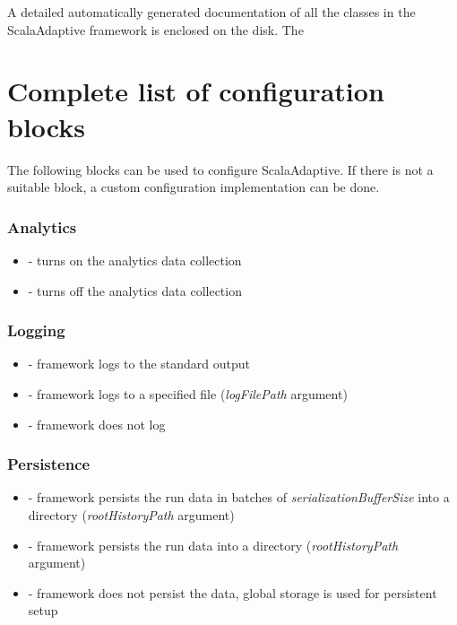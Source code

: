 \documentclass[12pt,a4paper]{report}
\begin{document}
A detailed automatically generated documentation of all the classes in the ScalaAdaptive framework is enclosed on the disk. The 

\section{Complete list of configuration blocks}
\label{attach:config_blocks}

The following blocks can be used to configure ScalaAdaptive. If there is not a suitable block, a custom configuration implementation can be done.

\subsubsection{Analytics}
\begin{itemize}
	\item {} - turns on the analytics data collection
	\item {} - turns off the analytics data collection
\end{itemize}

\subsubsection{Logging}
\begin{itemize}
	\item {} - framework logs to the standard output
	\item {} - framework logs to a specified file (\textit{logFilePath} argument)
	\item {} - framework does not log
\end{itemize}

\subsubsection{Persistence}
\begin{itemize}
	\item {} - framework persists the run data in batches of \textit{serializationBufferSize} into a directory (\textit{rootHistoryPath} argument)
	\item {} - framework persists the run data into a directory (\textit{rootHistoryPath} argument)
	\item {} - framework does not persist the data, global storage is used for persistent setup
\end{itemize}
\end{document}
